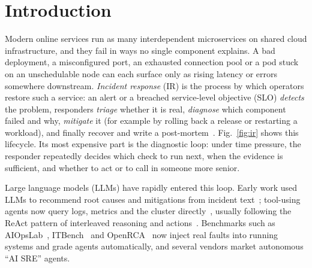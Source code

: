 
\section{Introduction}
\label{sec:intro}

Modern online services run as many interdependent microservices on shared cloud
infrastructure, and they fail in ways no single component explains. A bad
deployment, a misconfigured port, an exhausted connection pool or a pod stuck on an
unschedulable node can each surface only as rising latency or errors somewhere
downstream. \emph{Incident response} (IR) is the process by which operators
restore such a service: an alert or a breached service-level objective (SLO)
\emph{detects} the problem, responders \emph{triage} whether it is real,
\emph{diagnose} which component failed and why, \emph{mitigate} it (for example
by rolling back a release or restarting a workload), and finally recover and
write a post-mortem~\cite{beyer2016sre,nist80061r3}. Fig.~\ref{fig:ir} shows this
lifecycle. Its most expensive part is the diagnostic loop: under time pressure,
the responder repeatedly decides which check to run next, when the evidence is
sufficient, and whether to act or to call in someone more senior.

Large language models (LLMs) have rapidly entered this loop. Early work used LLMs
to recommend root causes and mitigations from incident text~\cite{ahmed2023recommending,chen2024rcacopilot};
tool-using agents now query logs, metrics and the cluster
directly~\cite{wang2024rcagent}, usually following the ReAct pattern of interleaved
reasoning and actions~\cite{yao2023react}. Benchmarks such as
AIOpsLab~\cite{chen2025aiopslab}, ITBench~\cite{jha2025itbench} and
OpenRCA~\cite{xu2025openrca} now inject real faults into running systems and grade
agents automatically, and several vendors market autonomous ``AI SRE'' agents.


